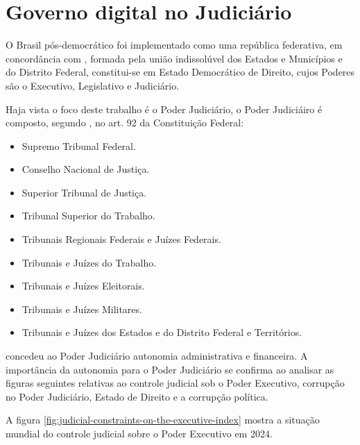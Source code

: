 \chapter{Governo digital no Judiciário}

O Brasil pós-democrático foi implementado como uma república  federativa, em concordância com \cite{cf88}, formada pela união indissolúvel dos Estados e Municípios e do Distrito Federal, constitui-se em Estado Democrático de Direito, cujos Poderes são o Executivo, Legislativo e Judiciário.

Haja vista o foco deste trabalho é o Poder Judiciário, o Poder Judiciáiro é composto, segundo \cite{cf88}, no art. 92 da Constituição Federal:

\begin{itemize}
    \item Supremo Tribunal Federal.
    \item Conselho Nacional de Justiça.
    \item Superior Tribunal de Justiça.
    \item Tribunal Superior do Trabalho.
    \item Tribunais Regionais Federais e Juízes Federais.
    \item Tribunais e Juízes do Trabalho.
    \item Tribunais e Juízes Eleitorais.
    \item Tribunais e Juízes Militares.
    \item  Tribunais e Juízes dos Estados e do Distrito Federal e Territórios.
\end{itemize}

\cite{cf88} concedeu ao Poder Judiciário autonomia administrativa e financeira. A importância da autonomia para o Poder Judiciário se confirma ao analisar as figuras seguintes relativas ao controle judicial sob o Poder Executivo,  corrupção no Poder Judiciário, Estado de Direito e a corrupção política.

A figura \ref{fig:judicial-constraints-on-the-executive-index} mostra a situação mundial do controle judicial sobre o Poder Executivo em 2024.

